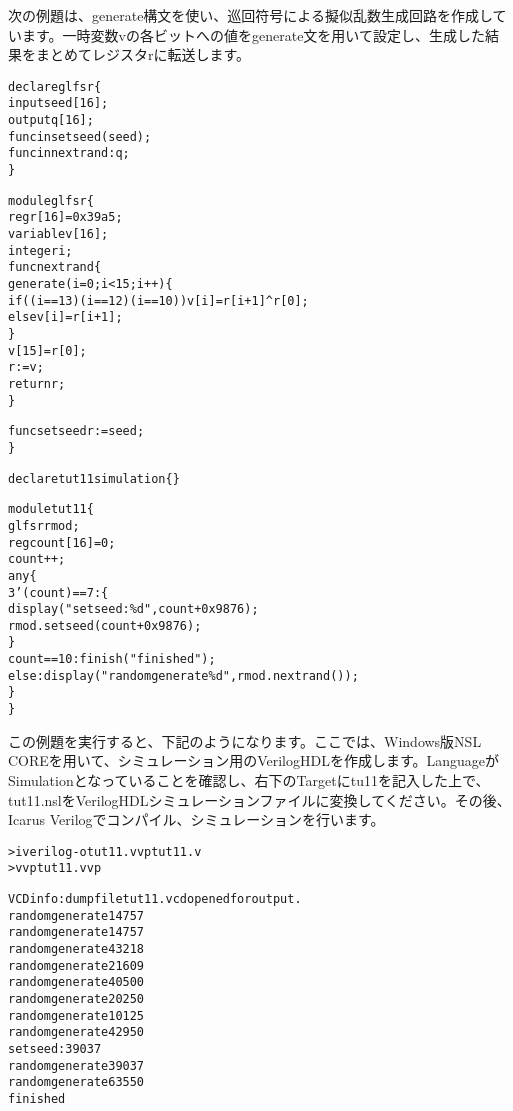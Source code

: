 次の例題は、generate構文を使い、巡回符号による擬似乱数生成回路を作成しています。一時変数vの各ビットへの値をgenerate文を用いて設定し、生成した結果をまとめてレジスタrに転送します。

\begin{reviewlist}
\begin{alltt}
declare glfsr \{
   input seed[16];
   output q[16];
   func\textunderscore{}in set\textunderscore{}seed(seed);
   func\textunderscore{}in next\textunderscore{}rand : q;
\}

module glfsr \{
   reg r[16] = 0x39a5;
   variable v[16];
   integer i;
   func next\textunderscore{}rand \{
       generate (i=0;i\textless{}15;i++) \{
           if((i == 13) \textbar{}\textbar{} (i == 12) \textbar{}\textbar{} (i == 10)) v[i] = r[i+1] \textasciicircum{} r[0];
           else v[i] = r[i+1];
           \}
       v[15] = r[0];
       r:=v;
       return r;
   \}

   func set\textunderscore{}seed r:=seed;
\}

declare tut11 simulation \{\}

module tut11 \{
   glfsr rmod;
   reg count[16]=0;
   count++;
   any \{
       3'(count) == 7: \{
           \textunderscore{}display("set seed:\%d",count+0x9876);
           rmod.set\textunderscore{}seed(count+0x9876);
       \}
       count==10:    \textunderscore{}finish("finished");
       else:    \textunderscore{}display("random generate \%d", rmod.next\textunderscore{}rand());
   \}
\}
\end{alltt}
\end{reviewlist}


この例題を実行すると、下記のようになります。ここでは、Windows版NSL COREを用いて、シミュレーション用のVerilogHDLを作成します。LanguageがSimulationとなっていることを確認し、右下のTargetにtu11を記入した上で、tut11.nslをVerilogHDLシミュレーションファイルに変換してください。その後、Icarus Verilogでコンパイル、シミュレーションを行います。

\begin{reviewcmd}
\begin{alltt}
\textgreater{} iverilog -otut11.vvp tut11.v
\textgreater{} vvp tut11.vvp

VCD info: dumpfile tut11.vcd opened for output.
random generate 14757
random generate 14757
random generate 43218
random generate 21609
random generate 40500
random generate 20250
random generate 10125
random generate 42950
set seed:39037
random generate 39037
random generate 63550
finished
\end{alltt}
\end{reviewcmd}
